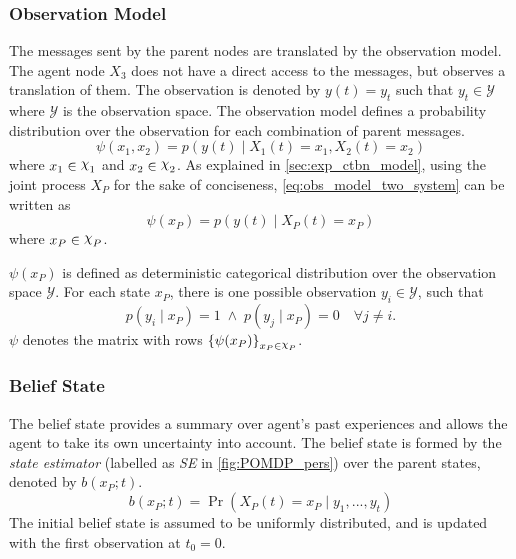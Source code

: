 \subsubsection{Observation Model}
\label{sec:observ_model}
The messages sent by the parent nodes are translated by the observation model. The agent node $ X_3 $ does not have a direct access to the messages, but observes a translation of them. The observation is denoted by $ y(t) = y_t $ such that $ y_t \in \mathcal{Y} $ where $ \mathcal{Y} $ is the observation space. The observation model defines a probability distribution over the observation for each combination of parent messages.
\begin{equation}
\psi(x_1, x_2) = p(y(t) \mid X_{1}(t)=x_1, X_{2}(t)=x_2)
\label{eq:obs_model_two_system}
\end{equation}
where $ x_1 \in \rchi_1 $ and $ x_2 \in \rchi_2 $. As explained in \cref{sec:exp_ctbn_model}, using the joint process $ X_P $ for the sake of conciseness, \autoref{eq:obs_model_two_system} can be written as
\begin{equation}
\psi(x_P) = p(y(t) \mid X_P(t)=x_P)
\label{eq:obs_model_p}
\end{equation}
where $ x_P \in \rchi_P $. \par
$ \psi(x_P) $ is defined as deterministic categorical distribution over the observation space $ \mathcal{Y} $. For each state $ x_P $, there is one possible observation $ y_i \in \mathcal{Y} $, such that \begin{equation}
p(y_i \mid x_P) = 1 \;\wedge \;p(y_j \mid x_P) = 0 \quad \forall j \neq i .
\label{eq:det_cat_dist}
\end{equation} 
$ \psi $ denotes the matrix with rows $ \left\lbrace \psi(x_P)\right\rbrace_{x_P \in \rchi_P} $.
\subsubsection{Belief State}
The belief state provides a summary over agent's past experiences and allows the agent to take its own uncertainty into account. The belief state is formed by the \textit{state estimator} (labelled as \textit{SE} in \cref{fig:POMDP_pers}) over the parent states, denoted by $  b(x_P; t) $. 
\begin{equation}
b(x_P; t) = \operatorname{Pr}( X_P(t) = x_P \mid y_{1}, ..., y_{t})
\end{equation}
The initial belief state is assumed to be uniformly distributed, and is updated with the first observation at $ t_0 = 0 $.
